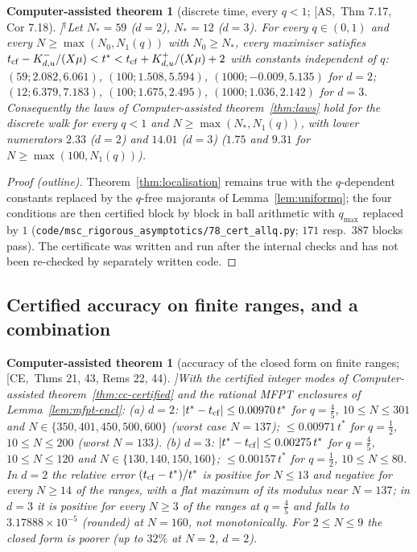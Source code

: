\documentclass[10pt,a4paper]{article}
\theoremstyle{plain}
\newtheorem{catheorem}[theorem]{Computer-assisted theorem}
\theoremstyle{definition}
\newcommand{\NEW}{\ensuremath{^{\dagger}}}       %
\newcommand{\src}[2]{[\textsf{#1},~#2]}           %
\newcommand{\ASY}{\textsf{AS}}
\newcommand{\CER}{\textsf{CE}}
\begin{document}
\begin{catheorem}[discrete time, every $q<1$; \src{\ASY}{Thm 7.17, Cor 7.18}]\NEW\label{thm:cf-disc-allq}
Let $N_*=59$ ($d=2$), $N_*=12$ ($d=3$). For every $q\in(0,1)$ and every $N\ge\max(N_0,N_1(q))$ with $N_0\ge N_*$, every maximiser satisfies $t_{\rm cf}-K^-_{d,u}/(X\mu)<t^*<t_{\rm cf}+K^+_{d,u}/(X\mu)+2$ with constants independent of $q$: $(59;2.082,6.061)$, $(100;1.508,5.594)$, $(1000;-0.009,5.135)$ for $d=2$; $(12;6.379,7.183)$, $(100;1.675,2.495)$, $(1000;1.036,2.142)$ for $d=3$. Consequently the laws of Computer-assisted theorem~\ref{thm:laws} hold for the discrete walk for every $q<1$ and $N\ge\max(N_*,N_1(q))$, with lower numerators $2.33$ ($d=2$) and $14.01$ ($d=3$) ($1.75$ and $9.31$ for $N\ge\max(100,N_1(q))$).
\end{catheorem}
\begin{proof}[Proof (outline)]
Theorem~\ref{thm:localisation} remains true with the $q$-dependent constants replaced by the $q$-free majorants of Lemma~\ref{lem:uniformq}; the four conditions are then certified block by block in ball arithmetic with $q_{\max}$ replaced by $1$ (\texttt{code/msc\_rigorous\_asymptotics/78\_cert\_allq.py}; $171$ resp.\ $387$ blocks pass). The certificate was written and run after the internal checks and has not been re-checked by separately written code.
\end{proof}

\subsection{Certified accuracy on finite ranges, and a combination}

\begin{catheorem}[accuracy of the closed form on finite ranges; \src{\CER}{Thms 21, 43, Rems 22, 44}]\label{thm:cf-finite}
With the certified integer modes of Computer-assisted theorem~\ref{thm:cc-certified} and the rational MFPT enclosures of Lemma~\ref{lem:mfpt-encl}:
(a) $d=2$: $|t^*-t_{\rm cf}|\le0.00970\,t^*$ for $q=\frac45$, $10\le N\le301$ and $N\in\{350,401,450,500,600\}$ (worst case $N=137$); $\le0.00971\,t^*$ for $q=\frac12$, $10\le N\le200$ (worst $N=133$).
(b) $d=3$: $|t^*-t_{\rm cf}|\le0.00275\,t^*$ for $q=\frac45$, $10\le N\le120$ and $N\in\{130,140,150,160\}$; $\le0.00157\,t^*$ for $q=\frac12$, $10\le N\le80$.
In $d=2$ the relative error $(t_{\rm cf}-t^*)/t^*$ is positive for $N\le13$ and negative for every $N\ge14$ of the ranges, with a flat maximum of its modulus near $N=137$; in $d=3$ it is positive for every $N\ge3$ of the ranges at $q=\frac45$ and falls to $3.17888\times10^{-5}$ (rounded) at $N=160$, not monotonically. For $2\le N\le9$ the closed form is poorer (up to $32\%$ at $N=2$, $d=2$).
\end{catheorem}
\end{document}
